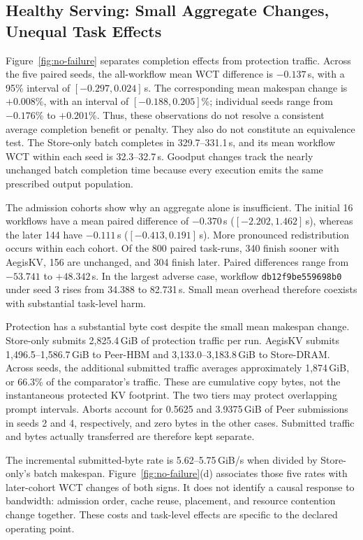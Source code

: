 \subsection{Healthy Serving: Small Aggregate Changes, Unequal Task Effects}
\label{sec:healthy-results}


Figure~\ref{fig:no-failure} separates completion effects from protection
traffic. Across the five paired seeds, the all-workflow mean WCT difference
is $-0.137$\,s, with a 95\% interval of $[-0.297,0.024]$\,s.
The corresponding mean makespan change is $+0.008$\%, with an interval of
$[-0.188,0.205]$\%; individual seeds range from $-0.176$\% to $+0.201$\%.
Thus, these observations do not resolve a consistent average completion
benefit or penalty. They also do not constitute an equivalence test. The
Store-only batch completes in 329.7--331.1\,s, and its mean workflow WCT
within each seed is 32.3--32.7\,s. Goodput changes track the nearly unchanged
batch completion time because every execution emits the same prescribed
output population.

The admission cohorts show why an aggregate alone is insufficient.
The initial 16 workflows have a mean paired difference of $-0.370$\,s
($[-2.202,1.462]$\,s), whereas the later 144 have $-0.111$\,s
($[-0.413,0.191]$\,s). More pronounced redistribution occurs within each
cohort. Of the 800 paired task-runs, 340 finish sooner with AegisKV, 156
are unchanged, and 304 finish later. Paired differences
range from $-53.741$ to $+48.342$\,s. In the largest adverse case, workflow
\texttt{db12f9be559698b0} under seed 3 rises from 34.388 to 82.731\,s.
Small mean overhead therefore coexists with substantial task-level harm.

Protection has a substantial byte cost despite the small mean makespan
change. Store-only submits 2,825.4\,GiB of protection traffic per run.
AegisKV submits 1,496.5--1,586.7\,GiB to Peer-HBM and
3,133.0--3,183.8\,GiB to Store-DRAM. Across seeds, the additional submitted
traffic averages approximately 1,874\,GiB, or 66.3\% of the comparator's
traffic. These are cumulative copy bytes, not the instantaneous protected
KV footprint. The two tiers may protect overlapping prompt intervals.
Aborts account for 0.5625 and 3.9375\,GiB of Peer submissions in seeds 2
and 4, respectively, and zero bytes in the other cases. Submitted traffic
and bytes actually transferred are therefore kept separate.

The incremental submitted-byte rate is 5.62--5.75\,GiB/s when divided by
Store-only's batch makespan. Figure~\ref{fig:no-failure}(d) associates those
five rates with later-cohort WCT changes of both signs. It does not identify
a causal response to bandwidth: admission order, cache reuse, placement,
and resource contention change together. These costs and task-level effects are specific to the declared operating point.

